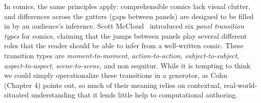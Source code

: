 In comics, the same principles apply: comprehensible comics lack visual
clutter, and differences across the gutters (gaps between panels) are
designed to be filled in by an audience's inference.  
Scott McCloud~\cite{mcCloud1993understanding} introduced six {\em
panel transition types} for comics, claiming that the jumps between panels
play several different roles that the reader should be able to infer from a
well-written comic. These transition types are {\em moment-to-moment}, {\em
action-to-action}, {\em subject-to-subject}, {\em aspect-to-aspect}, {\em
scene-to-scene}, and non sequitur. While it is tempting to think we could
simply operationalize these transitions in a generator, as
Cohn~\cite{cohn2013visual} (Chapter 4) points out, so much of their meaning
relies on contextual, real-world-situated understanding that it lends
little help to computational authoring.


